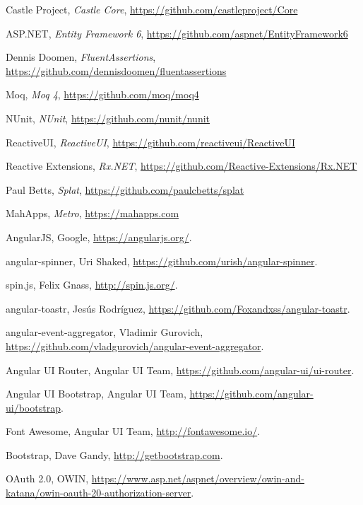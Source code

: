 \documentclass[10pt,a4paper]{article}
\begin{document}
\begin{thebibliography}{99}

	Castle Project,
	\emph{Castle Core},
	\url{https://github.com/castleproject/Core}

	ASP.NET,
	\emph{Entity Framework 6},
	\url{https://github.com/aspnet/EntityFramework6}

	Dennis Doomen,
	\emph{FluentAssertions},
	\url{https://github.com/dennisdoomen/fluentassertions}

	Moq,
	\emph{Moq 4},
	\url{https://github.com/moq/moq4}

	NUnit,
	\emph{NUnit},
	\url{https://github.com/nunit/nunit}

	ReactiveUI,
	\emph{ReactiveUI},
	\url{https://github.com/reactiveui/ReactiveUI}

	Reactive Extensions,
	\emph{Rx.NET},
	\url{https://github.com/Reactive-Extensions/Rx.NET}

	Paul Betts,
	\emph{Splat},
	\url{https://github.com/paulcbetts/splat}

	MahApps,
	\emph{Metro},
	\url{https://mahapps.com}

	AngularJS,
	Google,
	\url{https://angularjs.org/}.

	angular-spinner,
	Uri Shaked,
	\url{https://github.com/urish/angular-spinner}.

	spin.js,
	Felix Gnass,
	\url{http://spin.js.org/}.

	angular-toastr,
	Jesús Rodríguez,
	\url{https://github.com/Foxandxss/angular-toastr}.

	angular-event-aggregator,
	Vladimir Gurovich,
	\url{https://github.com/vladgurovich/angular-event-aggregator}.

	Angular UI Router,
	Angular UI Team,
	\url{https://github.com/angular-ui/ui-router}.

	Angular UI Bootstrap,
	Angular UI Team,
	\url{https://github.com/angular-ui/bootstrap}.

	Font Awesome,
	Angular UI Team,
	\url{http://fontawesome.io/}.

	Bootstrap,
	Dave Gandy,
	\url{http://getbootstrap.com}.

	OAuth 2.0,
	OWIN,
	\url{https://www.asp.net/aspnet/overview/owin-and-katana/owin-oauth-20-authorization-server}.


\end{thebibliography}
\end{document}
